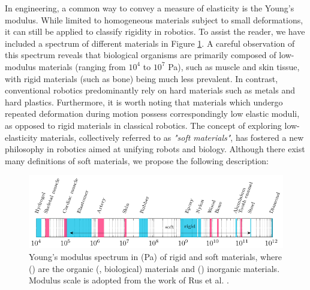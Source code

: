 In engineering, a common way to convey a measure of elasticity is the Young's modulus. While limited to homogeneous materials subject to small deformations, it can still be applied to classify rigidity in robotics. To assist the reader, we have included a spectrum of different materials in Figure \ref{fig:1:1}. A careful observation of this spectrum reveals that biological organisms are primarily composed of low-modulus materials (ranging from $10^4$ to $10^7$ \si{Pa}), such as muscle and skin tissue, with rigid materials (such as bone) being much less prevalent. In contrast, conventional robotics predominantly rely on hard materials such as metals and hard plastics. Furthermore, it is worth noting that materials which undergo repeated deformation during motion possess correspondingly low elastic moduli, as opposed to rigid materials in classical robotics. The concept of exploring low-elasticity materials, collectively referred to as \emph{"soft materials"}, has fostered a new philosophy in robotics aimed at unifying robots and biology. Although there exist many definitions of soft materials, we propose the following description:
%
\begin{figure}[!t]
    \centering
    \includegraphics*[width=\textwidth]{./pdf/thesis-figure-1-0.pdf}
    \caption{\small Young's modulus spectrum in (\si{Pa}) of rigid and soft materials, where () are the organic (\ie, biological) materials and () inorganic materials. Modulus scale is adopted from the work of Rus et al. \cite{Rus2015}.\label{fig:1:1}}
    \vspace{-4mm}
\end{figure}
%
\
